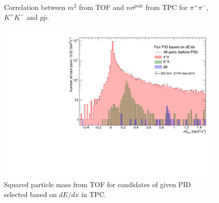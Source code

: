 \begin{figure}[ht!]
{  \begin{subfigure}[b]{\linewidth}{
                }
  \end{subfigure}
}%
\caption{Correlation between $m^{2}$ from TOF and $n\sigma^{\text{pair}}$ from TPC for $\pi^{+}\pi^{-}$, $K^{+}K^{-}$ and $p\bar{p}$.}
\end{figure}







\begin{figure}[ht!]
\centering%
\includegraphics[width=0.65\linewidth,page=1]{graphics/eventSelection/sqMassFromTof.pdf}%
\caption{Squared particle mass from TOF for candidates of given PID selected based on $dE/dx$ in TPC.}\label{fig:sqMassFromTof}%
\end{figure}









